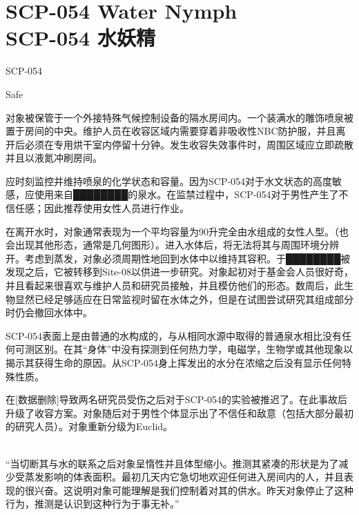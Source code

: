 \chapter[SCP-054 水妖精]{
    SCP-054 Water Nymph\\
    SCP-054 水妖精
}

\label{chap:SCP-054}

SCP-054

Safe

对象被保管于一个外接特殊气候控制设备的隔水房间内。一个装满水的雕饰喷泉被置于房间的中央。维护人员在收容区域内需要穿着非吸收性NBC防护服，并且离开后必须在专用烘干室内停留十分钟。发生收容失效事件时，周围区域应立即疏散并且以液氮冲刷房间。

应时刻监控并维持喷泉的化学状态和容量。因为SCP-054对于水文状态的高度敏感，应使用来自████████的泉水。在监禁过程中，SCP-054对于男性产生了不信任感；因此推荐使用女性人员进行作业。

在离开水时，对象通常表现为一个平均容量为90升完全由水组成的女性人型。（也会出现其他形态，通常是几何图形）。进入水体后，将无法将其与周围环境分辨开。考虑到蒸发，对象必须周期性地回到水体中以维持其容积。于████████被发现之后，它被转移到Site-08以供进一步研究。对象起初对于基金会人员很好奇，并且看起来很喜欢与维护人员和研究员接触，并且模仿他们的形态。数周后，此生物显然已经足够适应在日常监视时留在水体之外，但是在试图尝试研究其组成部分时仍会撤回水体中。

SCP-054表面上是由普通的水构成的，与从相同水源中取得的普通泉水相比没有任何可测区别。在其“身体”中没有探测到任何热力学，电磁学，生物学或其他现象以揭示其获得生命的原因。从SCP-054身上挥发出的水分在浓缩之后没有显示任何特殊性质。

在{[}数据删除]导致两名研究员受伤之后对于SCP-054的实验被推迟了。在此事故后升级了收容方案。对象随后对于男性个体显示出了不信任和敌意（包括大部分最初的研究人员）。对象重新分级为Euclid。


\begin{scpbox}

\\
“当切断其与水的联系之后对象呈惰性并且体型缩小。推测其紧凑的形状是为了减少受蒸发影响的体表面积。最初几天内它急切地欢迎任何进入房间内的人，并且表现的很兴奋。这说明对象可能理解是我们控制着对其的供水。昨天对象停止了这种行为，推测是认识到这种行为于事无补。”

\end{scpbox}

